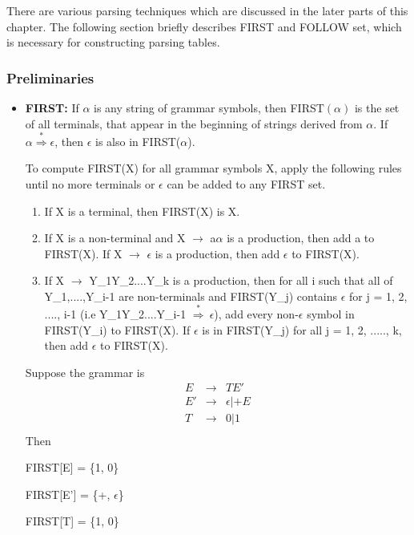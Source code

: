 There are various parsing techniques which are discussed in the later parts of this chapter. The following section briefly describes FIRST and FOLLOW set, which is necessary for constructing parsing tables.

\subsubsection{Preliminaries}
\label{ssubsec:preliminary}

\begin{itemize}
\item \textbf{FIRST:} If $\alpha$ is any string of grammar symbols, then FIRST$(\alpha)$ is the set of all terminals, that appear in the beginning of strings derived from $\alpha$. If $\alpha\overset{*}{\Rightarrow}\epsilon$, then $\epsilon$ is also in FIRST($\alpha$).

To compute FIRST(X) for all grammar symbols X, apply the following rules until no more terminals or $\epsilon$ can be added to any FIRST set.
\begin{enumerate}
\item If X is a terminal, then FIRST(X) is {X}.
\item If X is a non-terminal and X $\to$ a$\alpha$ is a production, then add a to FIRST(X). If X $\to$ $\epsilon$ is a production, then add $\epsilon$ to FIRST(X).
\item If X $\to$ Y_1Y_2....Y_k is a production, then for all i such that all of Y_1,....,Y_{i-1} are non-terminals and FIRST(Y_j) contains $\epsilon$ for j = 1, 2, ...., i-1 (i.e Y_1Y_2....Y_{i-1} $\overset{*}{\Rightarrow}\ \epsilon$), add every non-$\epsilon$ symbol in FIRST(Y_i) to FIRST(X). If $\epsilon$ is in FIRST(Y_j) for all j = 1, 2, ....., k, then add $\epsilon$ to FIRST(X).
\end{enumerate}

\begin{example}
\label{ex:First}
Suppose the grammar is
\begin{eqnarray*}
E &\to& T E'\\
E'&\to& \epsilon | + E\\
T &\to& 0 | 1\\
\end{eqnarray*}
Then

FIRST[E] = \{1, 0\}

FIRST[E'] = \{+, $\epsilon$\}

FIRST[T] = \{1, 0\}
\end{example}


\end{itemize}
